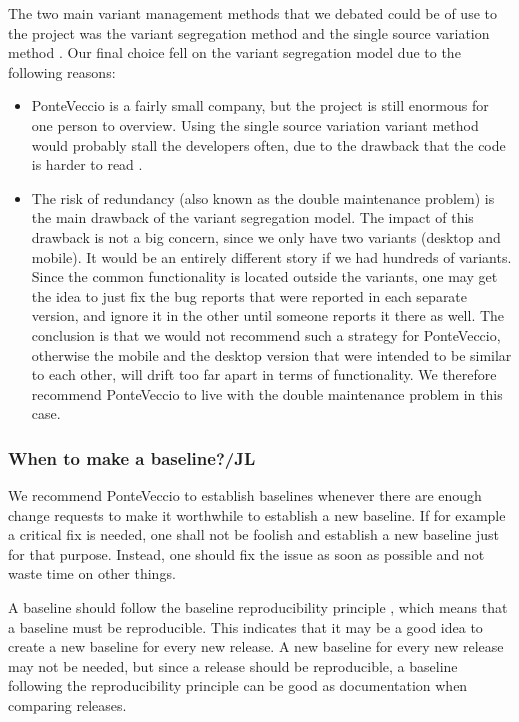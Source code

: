 \documentclass[10pt]{article}
\begin{document}
\noindent The two main variant management methods that we debated could be of use to the project was the variant segregation method and the single source variation method \cite{Mahler}. Our final choice fell on the variant segregation model due to the following reasons:
\begin{itemize}
\item PonteVeccio is a fairly small company, but the project is still enormous for one person to overview. Using the single source variation variant method would probably stall the developers often, due to the drawback that the code is harder to read \cite{Mahler}.
\item The risk of redundancy (also known as the double maintenance problem\cite{Babich}) is the main drawback of the variant segregation model\cite{Mahler}. The impact of this drawback is not a big concern, since we only have two variants (desktop and mobile). It would be an entirely different story if we had hundreds of variants. Since the common functionality is located outside the variants, one may get the idea to just fix the bug reports that were reported in each separate version, and ignore it in the other until someone reports it there as well. The conclusion is that we would not recommend such a strategy for PonteVeccio, otherwise the mobile and the desktop version that were intended to be similar to each other, will drift too far apart in terms of functionality. We therefore recommend PonteVeccio to live with the double maintenance problem in this case.

\end{itemize}
\noindent
\subsubsection{When to make a baseline?/JL}
We recommend PonteVeccio to establish baselines whenever there are enough change requests to make it worthwhile to establish a new baseline. If for example a critical fix is needed, one shall not be foolish and establish a new baseline just for that purpose. Instead, one should fix the issue as soon as possible and not waste time on other things. 

\noindent A baseline should follow the baseline reproducibility principle \cite{Appleton2}, which means that a baseline must be reproducible. This indicates that it may be a good idea to create a new baseline for every new release. A new baseline for every new release may not be needed, but since a release should be reproducible, a baseline following the reproducibility principle can be good as documentation when comparing releases.
\end{document}
